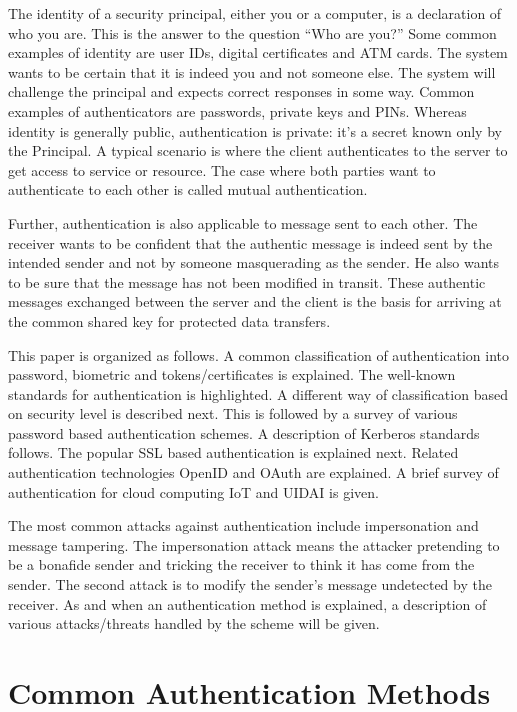 \begin{multicols}{2}
The identity of a security principal, either you or a computer, is a declaration of who you are. This is the answer to the question ``Who are you?'' Some common examples of identity are user IDs, digital certificates and ATM cards. The system wants to be certain that it is indeed you and not someone else. The system will challenge the principal and expects correct responses in some way. Common examples of authenticators are passwords, private keys and PINs. Whereas identity is generally public, authentication is private: it's a secret known only by the Principal. A typical scenario is where the client authenticates to the server to get access to service or resource. The case where both parties want to authenticate to each other is called mutual authentication. 

Further, authentication is also applicable to message sent to each other. The receiver wants to be confident that the authentic message is indeed sent by the intended sender and not by someone masquerading as the sender. He also wants to be sure that the message has not been modified in transit. These authentic messages exchanged between the server and the client is the basis for arriving at the common shared key for protected data transfers.

This paper is organized as follows. A common classification of authentication into password, biometric and tokens/certificates is explained. The well-known standards for authentication is highlighted. A different way of classification based on security level is described next. This is followed by a survey of various password based authentication schemes. A description of Kerberos standards follows. The popular SSL based authentication is explained next. Related authentication technologies OpenID and OAuth are explained. A brief survey of authentication for cloud computing IoT and UIDAI is given.

The most common attacks against authentication include impersonation and message tampering. The impersonation attack means the attacker pretending to be a bonafide sender and tricking the receiver to think it has come from the sender. The second attack is to modify the sender's message undetected by the receiver. As and when an authentication method is explained, a description of various attacks/threats handled by the scheme will be given.

\section*{Common Authentication Methods}


\end{multicols}
